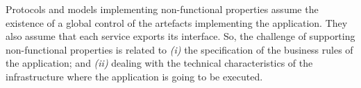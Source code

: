 
Protocols and models implementing non-functional properties assume the existence of a global control of the artefacts implementing the application.
They also assume that each service exports its interface.
So, the challenge of supporting non-functional properties is related to
\textit{(i)} the specification of the business rules of the application; and 
\textit{(ii)} dealing with the technical characteristics of the infrastructure where the application is  going to be executed.

%



